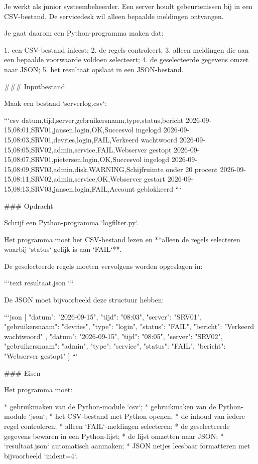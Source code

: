 Je werkt als junior systeembeheerder. Een server houdt gebeurtenissen bij in een CSV-bestand. De servicedesk wil alleen bepaalde meldingen ontvangen.

Je gaat daarom een Python-programma maken dat:

1. een CSV-bestand inleest;
2. de regels controleert;
3. alleen meldingen die aan een bepaalde voorwaarde voldoen selecteert;
4. de geselecteerde gegevens omzet naar JSON;
5. het resultaat opslaat in een JSON-bestand.

### Inputbestand

Maak een bestand `serverlog.csv`:

```csv
datum,tijd,server,gebruikersnaam,type,status,bericht
2026-09-15,08:01,SRV01,jansen,login,OK,Succesvol ingelogd
2026-09-15,08:03,SRV01,devries,login,FAIL,Verkeerd wachtwoord
2026-09-15,08:05,SRV02,admin,service,FAIL,Webserver gestopt
2026-09-15,08:07,SRV01,pietersen,login,OK,Succesvol ingelogd
2026-09-15,08:09,SRV03,admin,disk,WARNING,Schijfruimte onder 20 procent
2026-09-15,08:11,SRV02,admin,service,OK,Webserver gestart
2026-09-15,08:13,SRV03,jansen,login,FAIL,Account geblokkeerd
```

### Opdracht

Schrijf een Python-programma `logfilter.py`.

Het programma moet het CSV-bestand lezen en **alleen de regels selecteren waarbij `status` gelijk is aan `FAIL`**.

De geselecteerde regels moeten vervolgens worden opgeslagen in:

```text
resultaat.json
```

De JSON moet bijvoorbeeld deze structuur hebben:

```json
[
    {
        "datum": "2026-09-15",
        "tijd": "08:03",
        "server": "SRV01",
        "gebruikersnaam": "devries",
        "type": "login",
        "status": "FAIL",
        "bericht": "Verkeerd wachtwoord"
    },
    {
        "datum": "2026-09-15",
        "tijd": "08:05",
        "server": "SRV02",
        "gebruikersnaam": "admin",
        "type": "service",
        "status": "FAIL",
        "bericht": "Webserver gestopt"
    }
]
```

### Eisen

Het programma moet:

* gebruikmaken van de Python-module `csv`;
* gebruikmaken van de Python-module `json`;
* het CSV-bestand met Python openen;
* de inhoud van iedere regel controleren;
* alleen `FAIL`-meldingen selecteren;
* de geselecteerde gegevens bewaren in een Python-lijst;
* de lijst omzetten naar JSON;
* `resultaat.json` automatisch aanmaken;
* JSON netjes leesbaar formatteren met bijvoorbeeld `indent=4`.

